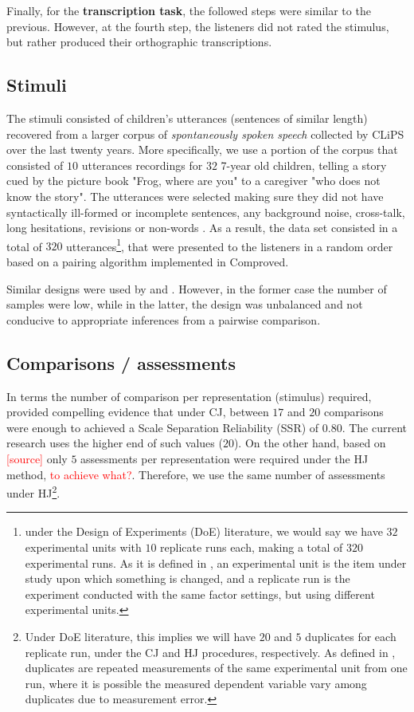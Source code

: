 Finally, for the \textbf{transcription task}, the followed steps were similar to the previous. However, at the fourth step, the listeners did not rated the stimulus, but rather produced their orthographic transcriptions.
%
%
\subsection{Stimuli}
%
The stimuli consisted of children's utterances (sentences of similar length) recovered from a larger corpus of \textit{spontaneously spoken speech} collected by CLiPS over the last twenty years. More specifically, we use a portion of the corpus that consisted of $10$ utterances recordings for $32$ 7-year old children, telling a story cued by the picture book "Frog, where are you" \citep{Mayer_1969} to a caregiver "who does not know the story". The utterances were selected making sure they did not have syntactically ill-formed or incomplete sentences, any background noise, cross-talk, long hesitations, revisions or non-words \citep{Boonen_et_al_2021}. As a result, the data set consisted in a total of $320$ utterances\footnote{under the Design of Experiments (DoE) literature, we would say we have $32$ experimental units with $10$ replicate runs each, making a total of $320$ experimental runs. As it is defined in \citet{Lawson_2015}, an experimental unit is the item under study upon which something is changed, and a replicate run is the experiment conducted with the same factor settings, but using different experimental units.}, that were presented to the listeners in a random order based on a pairing algorithm implemented in Comproved.

Similar designs were used by \citet{Boonen_et_al_2020} and \citet{Faes_et_al_2021}. However, in the former case the number of samples were low, while in the latter, the design was unbalanced and not conducive to appropriate inferences from a pairwise comparison.
%
%
\subsection{Comparisons / assessments}
%
In terms the number of comparison per representation (stimulus) required, \citet{Verhavert_2018} provided compelling evidence that under CJ, between $17$ and $20$ comparisons were enough to achieved a Scale Separation Reliability (SSR) of $0.80$. The current research uses the higher end of such values ($20$). On the other hand, based on \textcolor{red}{[source]} only $5$ assessments per representation were required under the HJ method, \textcolor{red}{to achieve what?}. Therefore, we use the same number of assessments under HJ\footnote{Under DoE literature, this implies we will have $20$ and $5$ duplicates for each replicate run, under the CJ and HJ procedures, respectively. As defined in \citet{Lawson_2015}, duplicates are repeated measurements of the same experimental unit from one run, where it is possible the measured dependent variable vary among duplicates due to measurement error.}.
%
%
